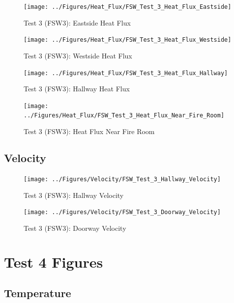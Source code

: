 \documentclass[12pt,oneside]{book}
\begin{document}
\begin{figure}[!ht]
	\texttt{[image: ../Figures/Heat\_Flux/FSW\_Test\_3\_Heat\_Flux\_Eastside]}
	\caption{Test 3 (FSW3): Eastside Heat Flux}
	\label{fig:Test_3_Eastside_Heat_Flux}
\end{figure}

\begin{figure}[!ht]
	\texttt{[image: ../Figures/Heat\_Flux/FSW\_Test\_3\_Heat\_Flux\_Westside]}
	\caption{Test 3 (FSW3): Westside Heat Flux}
	\label{fig:Test_3_Westside_Heat_Flux}
\end{figure}

\begin{figure}[!ht]
	\texttt{[image: ../Figures/Heat\_Flux/FSW\_Test\_3\_Heat\_Flux\_Hallway]}
	\caption{Test 3 (FSW3): Hallway Heat Flux}
	\label{fig:Test_3_Hallway_Heat_Flux}
\end{figure}

\begin{figure}[!ht]
	\texttt{[image: ../Figures/Heat\_Flux/FSW\_Test\_3\_Heat\_Flux\_Near\_Fire\_Room]}
	\caption{Test 3 (FSW3): Heat Flux Near Fire Room}
	\label{fig:Test_3_Heat_Flux_Near_Fire_Room}
\end{figure}

\subsection{Velocity}
\label{subsec:Velocity}

\begin{figure}[!ht]
	\texttt{[image: ../Figures/Velocity/FSW\_Test\_3\_Hallway\_Velocity]}
	\caption{Test 3 (FSW3): Hallway Velocity}
	\label{fig:Test_3_Hallway_Velocity}
\end{figure}

\begin{figure}[!ht]
	\texttt{[image: ../Figures/Velocity/FSW\_Test\_3\_Doorway\_Velocity]}
	\caption{Test 3 (FSW3): Doorway Velocity}
	\label{fig:Test_3_Doorway_Velocity}
\end{figure}

\clearpage

\section{Test 4 Figures}
\label{subsec:Test_4_Figures}

\subsection{Temperature}
\label{subsec:Temperature}
\end{document}
